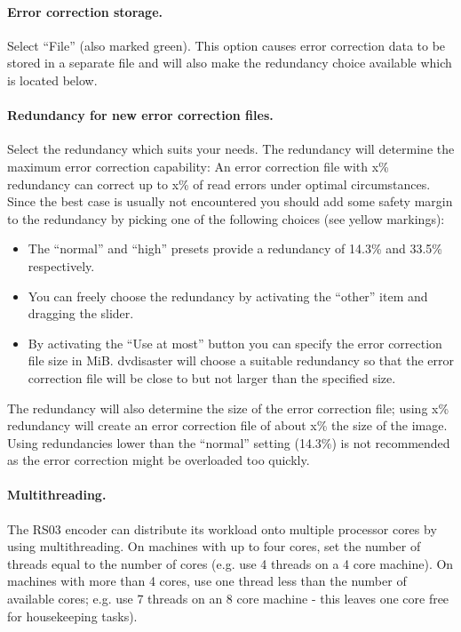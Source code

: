 \paragraph{Error correction storage.} Select ``File'' (also marked green).
This option causes error correction data to be stored in a separate file
and will also make the redundancy choice available which is located below.

\paragraph{Redundancy for new error correction files.} Select the redundancy
which suits your needs. The redundancy will determine the maximum error
correction capability: An error correction file with x\% redundancy can
correct up to x\% of read errors under optimal circumstances.
Since the best case is usually not encountered you should add some safety
margin to the redundancy by picking one of the following choices (see yellow markings):

\begin{itemize}
\item The ``normal'' and ``high'' presets provide a redundancy of 14.3\% and 33.5\%
  respectively.
\item You can freely choose the redundancy by activating the ``other'' item
  and dragging the slider.
\item By activating the ``Use at most'' button you can specify the error
  correction file size in MiB. dvdisaster will choose a suitable redundancy
  so that the error correction file will be close to but not larger than the
  specified size.
\end{itemize}
  
The redundancy will also determine the size of the error correction file;
using x\% redundancy will create an error correction file of about x\% the
size of the image. Using redundancies lower than the ``normal'' setting (14.3\%)
is not recommended as the error correction might be overloaded too quickly.

\paragraph{Multithreading.} The RS03 encoder can distribute its workload
onto multiple processor cores by using multithreading. On machines with
up to four cores, set the number of threads equal to the number of
cores (e.g. use 4 threads on a 4 core machine). On machines with more
than 4 cores, use one thread less than the number of available cores;
e.g. use 7 threads on an 8 core machine - this leaves one core free
for housekeeping tasks).

